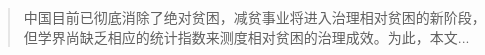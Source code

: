 \begin{abstract}

\indent 中国目前已彻底消除了绝对贫困，减贫事业将进入治理相对贫困的新阶段，
但学界尚缺乏相应的统计指数来测度相对贫困的治理成效。为此，本文...

\indent {}
\end{abstract}
